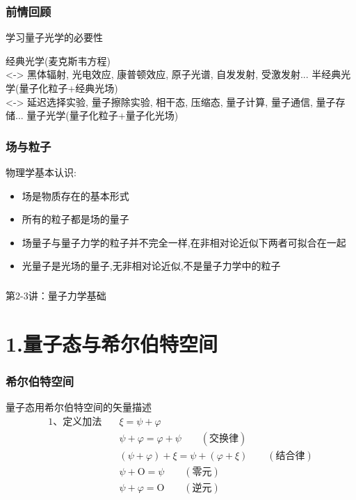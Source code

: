
\begin{frame}
    \frametitle{前情回顾}
    学习量子光学的必要性
    \begin{itemize}
        \Item 经典光学(麦克斯韦方程) \\
        <-> 黑体辐射, 光电效应, 康普顿效应, 原子光谱, 自发发射, 受激发射...
        \Item 半经典光学(量子化粒子+经典光场)  \\
        <-> 延迟选择实验, 量子擦除实验, 相干态, 压缩态, 量子计算, 量子通信, 量子存储...
        \Item 量子光学(量子化粒子+量子化光场)   
    \end{itemize}     
\end{frame}

\begin{frame}
    \frametitle{场与粒子}
    物理学基本认识:
    \begin{itemize}
        \item 场是物质存在的基本形式
        \item 所有的粒子都是场的量子
        \item 场量子与量子力学的粒子并不完全一样,在非相对论近似下两者可拟合在一起
        \item 光量子是光场的量子,无非相对论近似,不是量子力学中的粒子
    \end{itemize} 
\end{frame}

\begin{frame} [plain]
    \frametitle{}
    \Background[1] 
    \begin{center}
    {\huge 第2-3讲：量子力学基础}
    \end{center}  
    \addtocounter{framenumber}{-1}   
\end{frame}

\section{1.量子态与希尔伯特空间}

\begin{frame} 
    \frametitle{希尔伯特空间}
    量子态用希尔伯特空间的矢量描述\\
    \begin{equation*}
        \begin{split}
            \text{1、定义加法} \quad  &\xi=\psi+\varphi\\
            &\psi+\varphi=\varphi+\psi \qquad (\text{交换律})\\
            &(\psi+\varphi)+\xi=\psi+(\varphi+\xi) \qquad (\text{结合律})\\
            &\psi+\text{O}= \psi \qquad (\text{零元})\\
            &\psi+\varphi= \text{O} \qquad (\text{逆元})\\
        \end{split}  
    \end{equation*}
\end{frame} 

